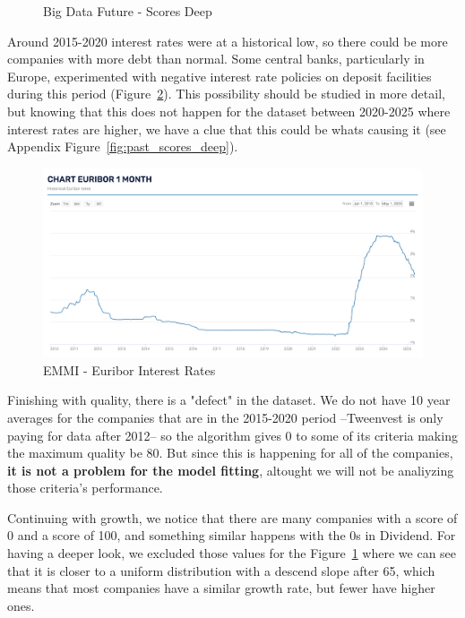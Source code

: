 \documentclass[11pt,english,a4paper,hidelinks]{book}
\begin{document}
\begin{figure}[H]
\begin{minipage}{0.48\textwidth}
        \caption{Big Data Future - Scores Deep}
        \label{fig:scores_deep}
    \end{minipage}
\end{figure}

\noindent Around 2015-2020 interest rates were at a historical low, so there could be more companies with more debt than normal. Some central banks, particularly in Europe, experimented with negative interest rate policies on deposit facilities during this period (Figure~\ref{fig:euribor}). This possibility should be studied in more detail, but knowing that this does not happen for the dataset between 2020-2025 where interest rates are higher, we have a clue that this could be whats causing it (see Appendix Figure~\ref{fig:past_scores_deep}).


\begin{figure}[H]
    \centering
    \includegraphics[width=1\linewidth]{images/macros/Euribor.png}
    \caption{EMMI - Euribor Interest Rates}
    \label{fig:euribor}
\end{figure}



\vspace{0.5cm}
\noindent Finishing with quality, there is a "defect" in the dataset. We do not have 10 year averages for the companies that are in the 2015-2020 period --Tweenvest is only paying for data after 2012-- so the algorithm gives 0 to some of its criteria making the maximum quality be 80. But since this is happening for all of the companies, \textbf{it is not a problem for the model fitting}, altought we will not be analiyzing those criteria's performance.

\vspace{0.5cm}
\noindent Continuing with growth, we notice that there are many companies with a score of 0 and a score of 100, and something similar happens with the 0s in Dividend. For having a deeper look, we excluded those values for the Figure~\ref{fig:scores_deep} where we can see that it is closer to a uniform distribution with a descend slope after 65, which means that most companies have a similar growth rate, but fewer have higher ones.
\end{document}
